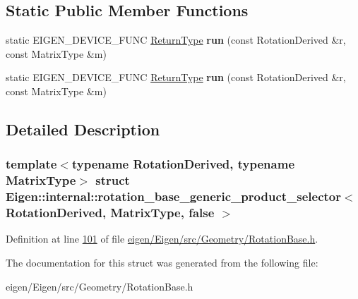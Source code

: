 \subsection*{Static Public Member Functions}
\begin{DoxyCompactItemize}
\item 
\mbox{\label{struct_eigen_1_1internal_1_1rotation__base__generic__product__selector_3_01_rotation_derived_00_01_matrix_type_00_01false_01_4_a4b6de128f1557d57efdaef40aaee06b7}} 
static E\+I\+G\+E\+N\+\_\+\+D\+E\+V\+I\+C\+E\+\_\+\+F\+U\+NC \hyperlink{group___core___module_class_eigen_1_1_matrix}{Return\+Type} {\bfseries run} (const Rotation\+Derived \&r, const Matrix\+Type \&m)
\item 
\mbox{\label{struct_eigen_1_1internal_1_1rotation__base__generic__product__selector_3_01_rotation_derived_00_01_matrix_type_00_01false_01_4_a4b6de128f1557d57efdaef40aaee06b7}} 
static E\+I\+G\+E\+N\+\_\+\+D\+E\+V\+I\+C\+E\+\_\+\+F\+U\+NC \hyperlink{group___core___module_class_eigen_1_1_matrix}{Return\+Type} {\bfseries run} (const Rotation\+Derived \&r, const Matrix\+Type \&m)
\end{DoxyCompactItemize}


\subsection{Detailed Description}
\subsubsection*{template$<$typename Rotation\+Derived, typename Matrix\+Type$>$\newline
struct Eigen\+::internal\+::rotation\+\_\+base\+\_\+generic\+\_\+product\+\_\+selector$<$ Rotation\+Derived, Matrix\+Type, false $>$}



Definition at line \hyperlink{eigen_2_eigen_2src_2_geometry_2_rotation_base_8h_source_l00101}{101} of file \hyperlink{eigen_2_eigen_2src_2_geometry_2_rotation_base_8h_source}{eigen/\+Eigen/src/\+Geometry/\+Rotation\+Base.\+h}.



The documentation for this struct was generated from the following file\+:\begin{DoxyCompactItemize}
\item 
eigen/\+Eigen/src/\+Geometry/\+Rotation\+Base.\+h\end{DoxyCompactItemize}
